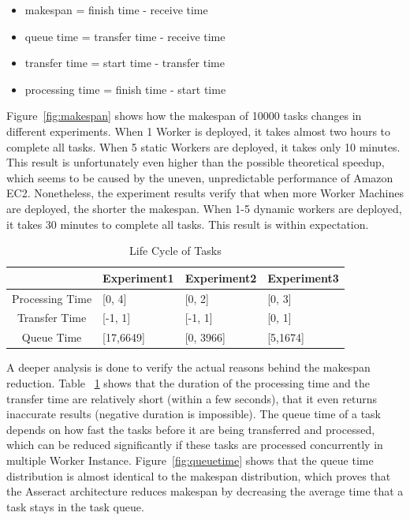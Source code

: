\documentclass[conference]{IEEEtran}
\begin{document}
\begin{itemize}
  \item makespan = finish time - receive time
  \item queue time = transfer time - receive time
  \item transfer time = start time - transfer time
  \item processing time = finish time - start time \\
\end{itemize} 

Figure~\ref{fig:makespan} shows how the makespan of 10000 tasks changes in different experiments. When 1 Worker is deployed, it takes almost two hours to complete all tasks. When 5 static Workers are deployed, it takes only 10 minutes. This result is unfortunately even higher than the possible theoretical speedup, which seems to be caused by the uneven, unpredictable performance of Amazon EC2. Nonetheless, the experiment results verify that when more Worker Machines are deployed, the shorter the makespan. When 1-5 dynamic workers are deployed, it takes 30 minutes to complete all tasks. This result is within expectation.

\begin{table}[H]
\renewcommand{\arraystretch}{1.3}
\caption{Life Cycle of Tasks}\label{tab:tasks}
\centering
\begin{tabular*}{8cm}{c|p{1.5cm}|p{1.5cm}|p{1.5cm}}
    \hline
    & Experiment1 & Experiment2 & Experiment3\\
    \hline
    Processing Time&[0, 4]&[0, 2]&[0, 3]\\
    Transfer Time&[-1, 1]&[-1, 1]&[0, 1]\\
	Queue Time&[17,6649]&[0, 3966]&[5,1674]\\
    \hline
\end{tabular*}
\end{table}

A deeper analysis is done to verify the actual reasons behind the makespan reduction. Table  ~\ref{tab:tasks} shows that the duration of the processing time and the transfer time are relatively short (within a few seconds), that it even returns inaccurate results (negative duration is impossible). The queue time of a task depends on how fast the tasks before it are being transferred and processed, which can be reduced significantly if these tasks are processed concurrently in multiple Worker Instance. Figure~\ref{fig:queuetime} shows that the queue time distribution is almost identical to the makespan distribution, which proves that the Asseract architecture reduces makespan by decreasing the average time that a task stays in the task queue. 
\end{document}
